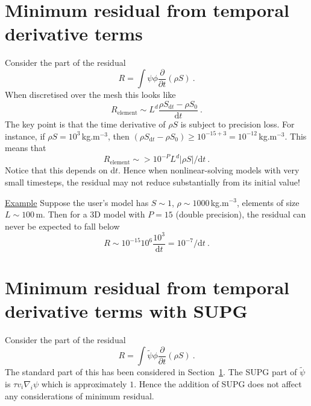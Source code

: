 \documentclass[]{scrreprt}
\begin{document}
\section{Minimum residual from temporal derivative terms}
\label{min.res.sec.temp}

Consider the part of the residual
\begin{equation}
R = \int \psi \phi \frac{\partial}{\partial t} \left( \rho S \right)
\ .
\end{equation}
When discretised over the mesh this looks like
\begin{equation}
R_{\mathrm{element}} \sim L^{d} \frac{\rho S_{\mathrm{d}t} - \rho
  S_{0}}{\mathrm{d}t} \ .
\end{equation}
The key point is that the time derivative of $\rho S$ is
subject to precision loss.  For instance, if $\rho S =
10^{3}$\,kg.m$^{-3}$, then $(\rho S_{\mathrm{d}t} - \rho S_{0}) \geq
10^{-15+3} = 10^{-12}$\,kg.m$^{-3}$.  This means that
\begin{equation}
R_{\mathrm{element}} \sim> 10^{-P}L^{d}{|\rho S|}/{\mathrm{d}t} \ .
\end{equation}
Notice that this depends on d$t$.  Hence when nonlinear-solving models
with very small timesteps, the residual may not reduce substantially
from its initial value!

{\underline{Example}}  Suppose the user's model has $S\sim 1$,
$\rho\sim 1000$\,kg.m$^{-3}$, elements of size $L\sim 100$\,m.  Then
for a 3D model with $P=15$ (double precision), the residual can never be expected to
fall below
\begin{equation}
R \sim 10^{-15}10^{6}\frac{10^{3}}{\mathrm{d}t} = 10^{-7}/{\mathrm{d}t}
  \ .
\end{equation}




\section{Minimum residual from temporal derivative terms with SUPG}

Consider the part of the residual
\begin{equation}
R = \int \tilde{\psi} \phi \frac{\partial}{\partial t} \left( \rho S \right)
\ .
\end{equation}
The standard part of this has been considered in
Section~\ref{min.res.sec.temp}.  The SUPG part of $\tilde{\psi}$ is
$\tau v_{i}\nabla_{i}\psi$ which is approximately $1$.  Hence the
addition of SUPG does not affect any considerations of minimum residual.
\end{document}
